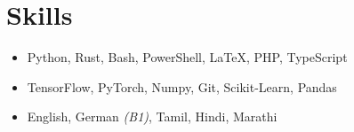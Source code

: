 %

\section*{Skills}
\begin{itemize}

\item {}\iftoggle{onepage}{\\}{ }Python, Rust, Bash, PowerShell, \LaTeX, PHP, TypeScript
\item {}\iftoggle{onepage}{\\}{ }TensorFlow, PyTorch, Numpy, Git, Scikit-Learn, Pandas
\item {}\iftoggle{onepage}{\\}{ }English, German \textit{\textcolor{misc}{(B1)}}, Tamil, Hindi, Marathi

\end{itemize}
